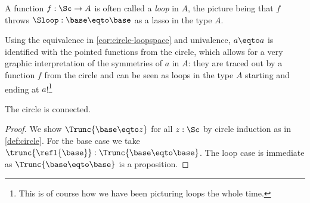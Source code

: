\begin{marginfigure}
\end{marginfigure}
\begin{remark}
  A function $f:\Sc\to A$ is often called a \emph{loop} in $A$, the
  picture being that $f$ throws $\Sloop:\base\eqto\base$ as a lasso in the
  type $A$.

  Using the equivalence in \cref{cor:circle-loopspace} and univalence,
  $a\eqto a$ is identified with the pointed
  functions from the circle, which allows for a very graphic
  interpretation of the symmetries of $a$ in $A$: they are traced out
  by a function $f$ from the circle and can be seen as loops in the type
  $A$ starting and ending at $a$!\footnote{%
    This is of course how we have been
    picturing loops the whole time.}
\end{remark}

\begin{lemma}\label{lem:circleisconnected}
  The circle is connected.
\end{lemma}
\begin{proof}
We show $\Trunc{\base\eqto z}$ for all $z:\Sc$ by circle induction
as in \cref{def:circle}.
For the base case we take $\trunc{\refl{\base}}:\Trunc{\base\eqto \base}$.
The loop case is immediate as $\Trunc{\base\eqto \base}$ is a proposition.
\end{proof}

